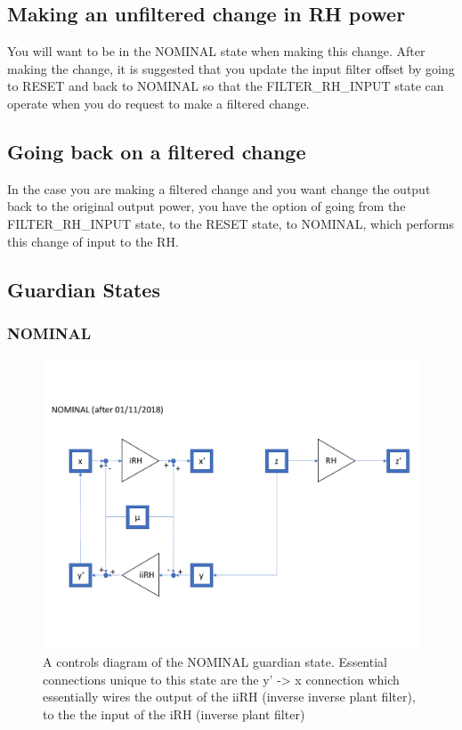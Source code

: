 \documentclass{article}
\begin{document}
\subsection{Making an unfiltered change in RH power}
You will want to be in the NOMINAL state when making this change. After making the change, it is suggested that you update the input filter offset by going to RESET and back to NOMINAL so that the FILTER\_RH\_INPUT state can operate when you do request to make a filtered change. 

\subsection{Going back on a filtered change}
In the case you are making a filtered change and you want change the output back to the original output power, you have the option of going from the FILTER\_RH\_INPUT state, to the RESET state, to NOMINAL, which performs this change of input to the RH. 

\subsection{Guardian States}
\subsubsection{NOMINAL}
\begin{figure}[H]
    \centering
    \includegraphics[width=1\textwidth]{NOMINAL_DIAGRAM.pdf}
    \caption{A controls diagram of the NOMINAL guardian state. Essential connections unique to this state are the y' -> x connection which essentially wires the output of the iiRH (inverse inverse plant filter), to the the input of the iRH (inverse plant filter)}
\end{figure}
\end{document}
